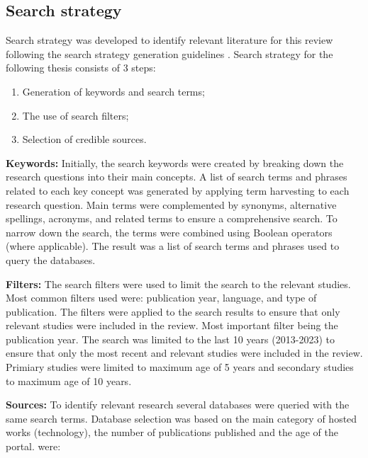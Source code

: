 \subsection{Search strategy}

Search strategy was developed to identify relevant literature for this review following the search strategy generation guidelines \cite[
  7-8]{systematic_review_2004}. Search strategy for the following thesis consists of 3 steps:

\begin{enumerate}
  \item Generation of keywords and search terms;
  \item The use of search filters;
  \item Selection of credible sources.
\end{enumerate}

\textbf{Keywords:} Initially, the search keywords were created by breaking down the research questions into their main concepts. A list of search terms and phrases related to each key concept was generated by applying term harvesting to each research question. Main terms were complemented by synonyms, alternative spellings, acronyms, and related terms to ensure a comprehensive search. To narrow down the search, the terms were combined using Boolean operators (where applicable). The result was a list of search terms and phrases used to query the databases.

\textbf{Filters:} The search filters were used to limit the search to the relevant studies. Most common filters used were: publication
year, language, and type of publication. The filters were applied to the search results to ensure that only relevant studies were
included in the review. Most important filter being the publication year. The search was limited to the last 10 years (2013-2023) to
ensure that only the most recent and relevant studies were included in the review. Primiary studies were limited to maximum age of 5
years and secondary studies to maximum age of 10 years.

\textbf{Sources:} To identify relevant research several databases were queried with the same search terms. Database selection was based
on the main category of hosted works (technology), the number of publications published and the age of the portal.
were:



